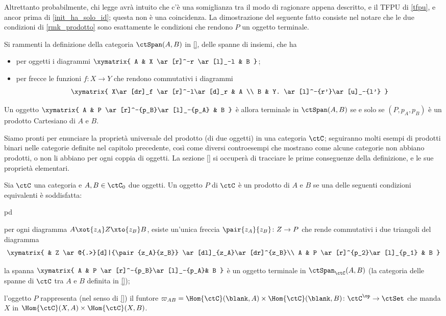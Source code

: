 Altrettanto probabilmente, chi legge avrà intuito che c'è una somiglianza tra il modo di ragionare appena descritto, e il TFPU di \ref{tfpu}, e ancor prima di \ref{init_ha_solo_id}; questa non è una coincidenza. La dimostrazione del seguente fatto consiste nel notare che le due condizioni di \ref{rmk_prodotto} sono esattamente le condizioni che rendono \(P\) un oggetto terminale.
\begin{proposition}
	Si rammenti la definizione della categoria \(\ctSpan(A,B)\) in \ref{}, delle spanne di insiemi, che ha
	\begin{itemize}
		\item per oggetti i diagrammi \(\xymatrix{ A & X \ar[r]^-r \ar[l]_-l & B }\);
		\item per frecce le funzioni \(f \colon X\to Y\) che rendono commutativi i diagrammi
		      \[\xymatrix{
			      X\ar[dr]_f \ar[r]^-l\ar[d]_r & A \\
			      B & Y. \ar[l]^-{r'}\ar[u]_-{l'}
			      }\]
	\end{itemize}
	Un oggetto \(\xymatrix{ A & P \ar[r]^-{p_B}\ar[l]_-{p_A} & B }\) è allora terminale in \(\ctSpan(A,B)\) se e solo se \((P,p_A,p_B)\) è un prodotto Cartesiano di \(A\) e \(B\).
\end{proposition}
Siamo pronti per enunciare la proprietà universale del prodotto (di due oggetti) in una categoria \(\ctC\); seguiranno molti esempi di prodotti binari nelle categorie definite nel capitolo precedente, così come diversi controesempi che mostrano come alcune categorie non abbiano prodotti, o non li abbiano per ogni coppia di oggetti. La sezione \ref{} si occuperà di tracciare le prime conseguenze della definizione, e le sue proprietà elementari.
\begin{definition}
	Sia \(\ctC\) una categoria e \(A,B\in\ctC_0\) due oggetti. Un oggetto \(P\) di \(\ctC\) è un prodotto di \(A\) e \(B\) se una delle seguenti condizioni equivalenti è soddisfatta:
	\begin{enumtag}{pd}
		\item\label{pd_1} per ogni diagramma \(A \xot{z_A} Z \xto{z_B} B\), esiste un'unica freccia \(\pair{z_A}{z_B} \colon Z\to P\)	che rende commutativi i due triangoli del diagramma
		\[\xymatrix{
			& Z \ar@{.>}[d]|{\pair{z_A}{z_B}} \ar[dl]_{z_A}\ar[dr]^{z_B}\\
			A & P \ar[r]^{p_2}\ar[l]_{p_1} & B
			}\]
		\item\label{pd_2} la spanna \(\xymatrix{
		A & P \ar[r]^-{p_B}\ar[l]_-{p_A}& B
		}\) è un oggetto terminale in \(\ctSpan_\ctC(A,B)\) (la categoria delle spanne di \(\ctC\) tra \(A\) e \(B\) definita in \ref{});
		\item\label{pd_3} l'oggetto	\(P\) rappresenta (nel senso di \ref{}) il funtore \(\varpi_{AB}=\Hom{\ctC}(\blank,A)\times\Hom{\ctC}(\blank,B) \colon \ctC^\op \to \ctSet\) che manda \(X\) in \(\Hom{\ctC}(X,A)\times\Hom{\ctC}(X,B)\).
	\end{enumtag}
\end{definition}
